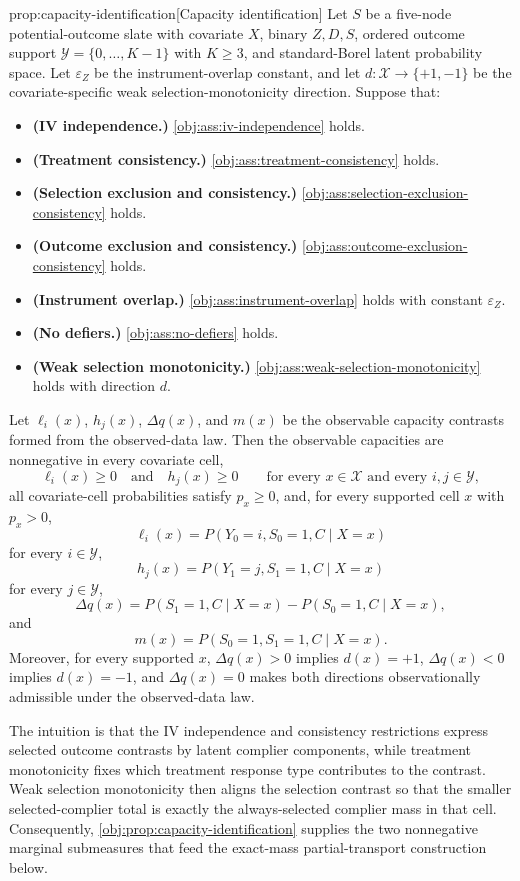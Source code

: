 \begin{theoremv}{prop:capacity-identification}[Capacity identification]
Let \(S\) be a five-node potential-outcome slate with covariate \(X\), binary \(Z,D,S\), ordered outcome support \(\mathcal Y=\{0,\ldots,K-1\}\) with \(K\ge 3\), and standard-Borel latent probability space. Let \(\varepsilon_Z\) be the instrument-overlap constant, and let \(d:\mathcal X\to\{+1,-1\}\) be the covariate-specific weak selection-monotonicity direction. Suppose that:
\begin{itemize}
\item \textbf{(IV independence.)} \cref{obj:ass:iv-independence} holds.
\item \textbf{(Treatment consistency.)} \cref{obj:ass:treatment-consistency} holds.
\item \textbf{(Selection exclusion and consistency.)} \cref{obj:ass:selection-exclusion-consistency} holds.
\item \textbf{(Outcome exclusion and consistency.)} \cref{obj:ass:outcome-exclusion-consistency} holds.
\item \textbf{(Instrument overlap.)} \cref{obj:ass:instrument-overlap} holds with constant \(\varepsilon_Z\).
\item \textbf{(No defiers.)} \cref{obj:ass:no-defiers} holds.
\item \textbf{(Weak selection monotonicity.)} \cref{obj:ass:weak-selection-monotonicity} holds with direction \(d\).
\end{itemize}
Let \(\ell_i(x)\), \(h_j(x)\), \(\Delta q(x)\), and \(m(x)\) be the observable capacity contrasts formed from the observed-data law. Then the observable capacities are nonnegative in every covariate cell,
\[
\ell_i(x)\ge 0\quad\text{and}\quad h_j(x)\ge 0
\qquad\text{for every }x\in\mathcal X\text{ and every }i,j\in\mathcal Y,
\]
all covariate-cell probabilities satisfy \(p_x\ge 0\), and, for every supported cell \(x\) with \(p_x>0\),
\[
\ell_i(x)=P(Y_0=i,S_0=1,C\mid X=x)
\]
for every \(i\in\mathcal Y\),
\[
h_j(x)=P(Y_1=j,S_1=1,C\mid X=x)
\]
for every \(j\in\mathcal Y\),
\[
\Delta q(x)=P(S_1=1,C\mid X=x)-P(S_0=1,C\mid X=x),
\]
and
\[
m(x)=P(S_0=1,S_1=1,C\mid X=x).
\]
Moreover, for every supported \(x\), \(\Delta q(x)>0\) implies \(d(x)=+1\), \(\Delta q(x)<0\) implies \(d(x)=-1\), and \(\Delta q(x)=0\) makes both directions observationally admissible under the observed-data law.
\end{theoremv}

The intuition is that the IV independence and consistency restrictions express selected outcome contrasts by latent complier components, while treatment monotonicity fixes which treatment response type contributes to the contrast. Weak selection monotonicity then aligns the selection contrast so that the smaller selected-complier total is exactly the always-selected complier mass in that cell. Consequently, \cref{obj:prop:capacity-identification} supplies the two nonnegative marginal submeasures that feed the exact-mass partial-transport construction below.
